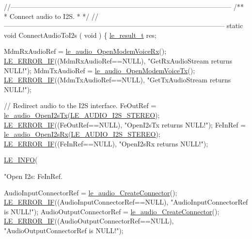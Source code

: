 \begin{DoxyCodeInclude}
{{{{{{{{{\textcolor{comment}{//--------------------------------------------------------------------------------------------------}\textcolor{comment}{}
\textcolor{comment}{/**}
\textcolor{comment}{ * Connect audio to I2S.}
\textcolor{comment}{ *}
\textcolor{comment}{ */}
\textcolor{comment}{//--------------------------------------------------------------------------------------------------}
\textcolor{keyword}{static} \textcolor{keywordtype}{void} ConnectAudioToI2s
(
    \textcolor{keywordtype}{void}
)
\{
    \hyperlink{le__basics_8h_a1cca095ed6ebab24b57a636382a6c86c}{le\_result\_t} res;

    MdmRxAudioRef = \hyperlink{le__audio__interface_8h_ae3ed568ba4d2763ea77e17e77b20ff02}{le\_audio\_OpenModemVoiceRx}();
    \hyperlink{le__log_8h_aceaf11a11691d6c676e36dd317b38dbd}{LE\_ERROR\_IF}((MdmRxAudioRef==NULL), \textcolor{stringliteral}{"GetRxAudioStream returns NULL!"});
    MdmTxAudioRef = \hyperlink{le__audio__interface_8h_ad745f008bb04873c817da7af3daf783d}{le\_audio\_OpenModemVoiceTx}();
    \hyperlink{le__log_8h_aceaf11a11691d6c676e36dd317b38dbd}{LE\_ERROR\_IF}((MdmTxAudioRef==NULL), \textcolor{stringliteral}{"GetTxAudioStream returns NULL!"});

    \textcolor{comment}{// Redirect audio to the I2S interface.}
    FeOutRef = \hyperlink{le__audio__interface_8h_a2633c1368adf60e342d7cadbbfa6278b}{le\_audio\_OpenI2sTx}(\hyperlink{le__audio__interface_8h_a94794180ed71a84bd26a1f525858f252a6ce77f5f956b203e15f662900a5103dd}{LE\_AUDIO\_I2S\_STEREO});
    \hyperlink{le__log_8h_aceaf11a11691d6c676e36dd317b38dbd}{LE\_ERROR\_IF}((FeOutRef==NULL), \textcolor{stringliteral}{"OpenI2sTx returns NULL!"});
    FeInRef = \hyperlink{le__audio__interface_8h_a9e7d0042c4f422554eb10d64535608e5}{le\_audio\_OpenI2sRx}(\hyperlink{le__audio__interface_8h_a94794180ed71a84bd26a1f525858f252a6ce77f5f956b203e15f662900a5103dd}{LE\_AUDIO\_I2S\_STEREO});
    \hyperlink{le__log_8h_aceaf11a11691d6c676e36dd317b38dbd}{LE\_ERROR\_IF}((FeInRef==NULL), \textcolor{stringliteral}{"OpenI2sRx returns NULL!"});

    \hyperlink{le__log_8h_a23e6d206faa64f612045d688cdde5808}{LE\_INFO}(\textcolor{stringliteral}{"Open I2s: FeInRef.%

    AudioInputConnectorRef = \hyperlink{le__audio__interface_8h_a570aaf85086f00aca592acfbaaa237be}{le\_audio\_CreateConnector}();
    \hyperlink{le__log_8h_aceaf11a11691d6c676e36dd317b38dbd}{LE\_ERROR\_IF}((AudioInputConnectorRef==NULL), \textcolor{stringliteral}{"AudioInputConnectorRef is NULL!"});
    AudioOutputConnectorRef = \hyperlink{le__audio__interface_8h_a570aaf85086f00aca592acfbaaa237be}{le\_audio\_CreateConnector}();
    \hyperlink{le__log_8h_aceaf11a11691d6c676e36dd317b38dbd}{LE\_ERROR\_IF}((AudioOutputConnectorRef==NULL), \textcolor{stringliteral}{"AudioOutputConnectorRef is NULL!"});

}}}}}}}}}}
\end{DoxyCodeInclude}
